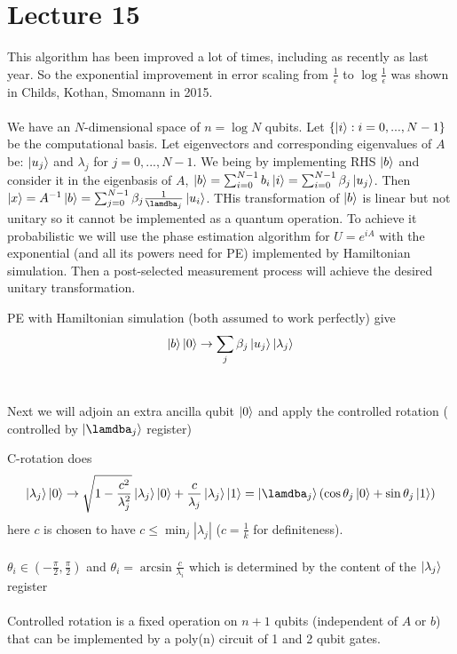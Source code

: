 \documentclass{article}
\begin{document}
\section{Lecture 15}
This algorithm has been improved a lot of times, including as recently as last year. So the exponential improvement in error scaling from $\frac{1}{\epsilon}$ to $\log \frac{1}{\epsilon}$ was shown in Childs, Kothan, Smomann in 2015.\\\\
We have an $N$-dimensional space of $n = \log N$ qubits. Let $\{\ket{i} : i = 0,..., N-1\}$ be the computational basis. Let eigenvectors and corresponding eigenvalues of $A$ be: $\ket{u_j} $ and $\lambda_j$ for $j = 0,...,N-1$. We being by implementing RHS $\ket{b}$ and consider it in the eigenbasis of $A$, $\ket{b} = \sum_{i=0}^{N-1} b_i \ket{i} = \sum_{i=0}^{N-1} \beta_j \ket{u_j}$. Then $\ket{x} = A^{-1} \ket{b} = \sum_{j=0}^{N-1} \beta_j \frac{1}{\lamdba_j} \ket{u_i}$. THis transformation of $\ket{b}$ is linear  but not unitary so it cannot be implemented as a quantum operation. To achieve it probabilistic we will use the phase estimation algorithm for $U= e^{iA}$ with the exponential (and all its powers need for PE) implemented by Hamiltonian simulation. Then a post-selected measurement process will achieve the desired unitary transformation.\begin{itemlist}\item  PE with Hamiltonian simulation (both assumed to work perfectly) give $$\ket{b} \ket{0} \rightarrow \sum_j \beta_j \ket{u_j} \ket{\lambda_j}$$\\
                \item Next we will adjoin an extra ancilla qubit $\ket{0}$ and apply the controlled rotation ( controlled by $\ket{\lamdba_j}$ register)\\
                \item C-rotation does 
                        $$
                        \ket{\lambda_j} \ket{0} \rightarrow \sqrt{1 - \frac{c^2}{\lambda^2_j}} \ket{\lambda_j} \ket{0} + \frac{c}{\lambda_j} \ket{\lambda_j} \ket{1} = \ket{\lamdba_j}( \cos \theta_j \ket{0} + \sin \theta_j \ket{1})
                        $$
                        here $c$ is chosen to have $c \leq \min_j |\lambda_j|$  ($c = \frac{1}{k}$ for definiteness).\\\\ $\theta_i \in (- \frac{\pi}{2}, \frac{\pi}{2})$ and $\theta_i = \arcsin \frac{c}{\lambda_i}$ which is determined by the content of the $\ket{\lambda_j}$ register\\\\Controlled rotation is a fixed operation on $n+1$ qubits (independent of $A$ or $b$) that can be implemented by a poly(n) circuit of 1 and 2 qubit gates.\\

\end{itemlist}
\end{document}

